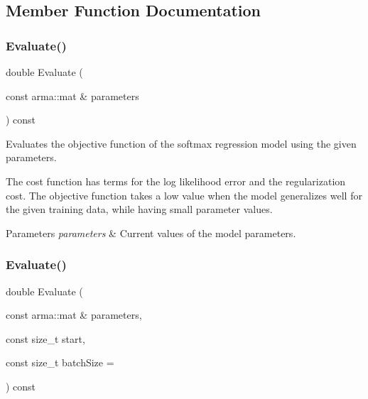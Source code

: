 \subsection{Member Function Documentation}
\mbox{\label{classmlpack_1_1regression_1_1SoftmaxRegressionFunction_a6c7f979b684b70aab5bec8b09b5eb1a4}} 
\subsubsection{Evaluate()\hspace{0.1cm}{\footnotesize\ttfamily [1/2]}}
{\footnotesize\ttfamily double Evaluate (\begin{DoxyParamCaption}\item[{const arma\+::mat \&}]{parameters }\end{DoxyParamCaption}) const}



Evaluates the objective function of the softmax regression model using the given parameters. 

The cost function has terms for the log likelihood error and the regularization cost. The objective function takes a low value when the model generalizes well for the given training data, while having small parameter values.


\begin{DoxyParams}{Parameters}
{\em parameters} & Current values of the model parameters. \\
\hline
\end{DoxyParams}
\mbox{\label{classmlpack_1_1regression_1_1SoftmaxRegressionFunction_a12589583139057b24a415995079f6ffe}} 
\subsubsection{Evaluate()\hspace{0.1cm}{\footnotesize\ttfamily [2/2]}}
{\footnotesize\ttfamily double Evaluate (\begin{DoxyParamCaption}\item[{const arma\+::mat \&}]{parameters,  }\item[{const size\+\_\+t}]{start,  }\item[{const size\+\_\+t}]{batch\+Size = {} }\end{DoxyParamCaption}) const}



